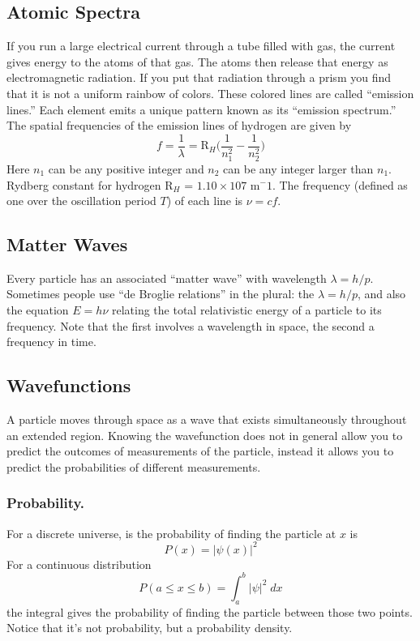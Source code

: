 \documentclass[../../../main.tex]{subfiles}
\begin{document}
\subsection{Atomic Spectra}
If you run a large electrical current through a tube filled with gas, the current gives energy to the atoms of that gas. The atoms then release that energy as electromagnetic radiation. If you put that radiation through a prism you find that it is not a uniform rainbow of colors. These colored lines are called “emission lines.” Each element emits a unique pattern known as its “emission spectrum.” The spatial frequencies of the emission lines of hydrogen are given by
\begin{equation*}
    f=\frac{1}{\lambda}=\text{R}_H\biggl(\frac{1}{n_1^2}-\frac{1}{n_2^2}\biggr)
\end{equation*}
Here $n_1$ can be any positive integer and $n_2$ can be any integer larger than $n_1$. Rydberg constant
for hydrogen R$_H$ = $1.10 \times 10 7$ m${^-1}$. The frequency (defined as one over the oscillation period $T$) of each line is $\nu = cf $.

\subsection{Matter Waves}
Every particle has an associated “matter wave” with wavelength $ \lambda = h/p$. Sometimes people use “de Broglie relations” in the plural: the $ \lambda = h/p$, and also the equation $E = h\nu$ relating the total relativistic energy of a particle to its frequency. Note that the first involves a wavelength in space, the second a frequency in time.

\subsection{Wavefunctions }
A particle moves through space as a wave that exists simultaneously throughout an extended region. Knowing the wavefunction does not in general allow you to predict the outcomes of measurements of the particle, instead it allows you to predict the probabilities of different measurements.

\subsubsection{Probability.} For a discrete universe, is the probability of finding the particle at $x$ is
\begin{equation*}
    P(x)=|\psi(x)|^2
\end{equation*}
For a continuous distribution 
\begin{equation*}
    P(a\leq x \leq b)=\int_{a}^{b}|\psi|^2\;dx
\end{equation*}
the integral gives the probability of finding the particle between those two points. Notice that it's not probability, but a probability density.
\end{document}
